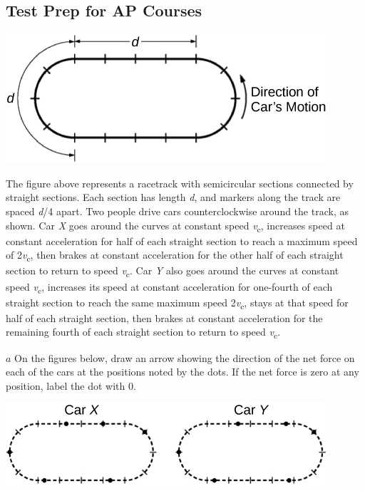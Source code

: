 \documentclass[
]{book}
\newenvironment{ap-test-prep}{}{}
\begin{document}
\hypertarget{fs-id1798867}{}
\begin{ap-test-prep}

\hypertarget{test-prep-for-ap-courses-9}{%
\subsection{Test Prep for AP Courses}\label{test-prep-for-ap-courses-9}}

\hypertarget{fs-id1691415}{}
\leavevmode\hypertarget{fs-id2244406}{}%
\includegraphics{images/Figure_04_01_03.jpg}

The figure above represents a racetrack with semicircular sections
connected by straight sections. Each section has length \emph{d}, and markers
along the track are spaced \emph{d}/4 apart. Two people drive cars
counterclockwise around the track, as shown. Car \emph{X} goes around the
curves at constant speed \emph{v}\textsubscript{c}, increases speed at constant
acceleration for half of each straight section to reach a maximum speed
of 2\emph{v}\textsubscript{c}, then brakes at constant acceleration for the other half of
each straight section to return to speed \emph{v}\textsubscript{c}. Car \emph{Y} also goes
around the curves at constant speed \emph{v}\textsubscript{c}, increases its speed at
constant acceleration for one-fourth of each straight section to reach
the same maximum speed 2\emph{v}\textsubscript{c}, stays at that speed for half of each
straight section, then brakes at constant acceleration for the remaining
fourth of each straight section to return to speed \emph{v}\textsubscript{c}.

\(a\) On the figures below, draw an arrow showing the direction of the
net force on each of the cars at the positions noted by the dots. If the
net force is zero at any position, label the dot with 0.

\includegraphics{images/Figure_04_01_04.jpg}


\end{ap-test-prep}
\end{document}

